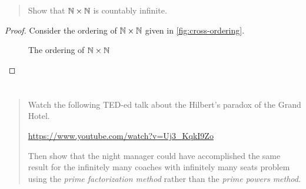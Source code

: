 \documentclass{article}
\begin{document}
\section{}
\begin{quote}
    Show that $\mathbb{N} \times \mathbb{N}$ is countably infinite.
\end{quote}

\begin{proof}
    Consider the ordering of $\mathbb{N} \times \mathbb{N}$ given in
    \autoref{fig:cross-ordering}.

    \begin{figure}[h]
        \centering
        \caption{The ordering of $\mathbb{N} \times \mathbb{N}$}\label{fig:cross-ordering}
    \end{figure}
\end{proof}

\section{}
\begin{quote}
    Watch the following TED-ed talk about the Hilbert's paradox of the Grand
    Hotel.
    \begin{center}
        \url{https://www.youtube.com/watch?v=Uj3_KqkI9Zo}
    \end{center}
    Then show that the night manager could have accomplished the same result
    for the infinitely many coaches with infinitely many seats problem using
    the \textit{prime factorization method} rather than the \textit{prime
        powers method}.
\end{quote}
\end{document}
